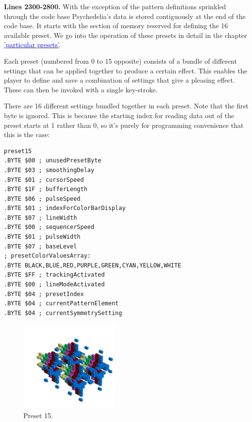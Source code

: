 \clearpage
{}
\textbf{Lines 2300-2800.} With the exception of the pattern definitions sprinkled through the code base Psychedelia's
data is stored contiguously at the end of the code base. It starts with the section of memory reserved for defining
the 16 available preset. We go into the operation of these presets in detail in the chapter
\hyperref[sec:presets]{\textcolor{blue}{'particular presets'}}.

Each preset (numbered from 0 to 15 opposite) consists of a bundle of different settings that can be applied together
to produce a certain effect. This enables the player to define and save a combination of settings that give a pleasing
effect. These can then be invoked with a single key-stroke.

There are 16 different settings bundled together in each preset. Note that the first byte is ignored. This is because
the starting index for reading data out of the preset starts at 1 rather than 0, so it's purely for programming
convenience that this is the case:
\begin{lstlisting}
preset15
.BYTE $00 ; unusedPresetByte
.BYTE $03 ; smoothingDelay
.BYTE $01 ; cursorSpeed
.BYTE $1F ; bufferLength
.BYTE $06 ; pulseSpeed
.BYTE $01 ; indexForColorBarDisplay
.BYTE $07 ; lineWidth
.BYTE $00 ; sequencerSpeed
.BYTE $01 ; pulseWidth
.BYTE $07 ; baseLevel
; presetColorValuesArray: 
.BYTE BLACK,BLUE,RED,PURPLE,GREEN,CYAN,YELLOW,WHITE
.BYTE $FF ; trackingActivated
.BYTE $00 ; lineModeActivated
.BYTE $04 ; presetIndex
.BYTE $04 ; currentPatternElement
.BYTE $04 ; currentSymmetrySetting

\end{lstlisting}
\begin{figure}[H]                                                          
  \centering                                                             
  \begin{adjustbox}{width=5cm,center}                                   
  \includegraphics[width=5cm]{src/presets/pattern15-45.png}%
  \end{adjustbox}                                                        
\caption{Preset 15.}                                           
\end{figure}                                                               

